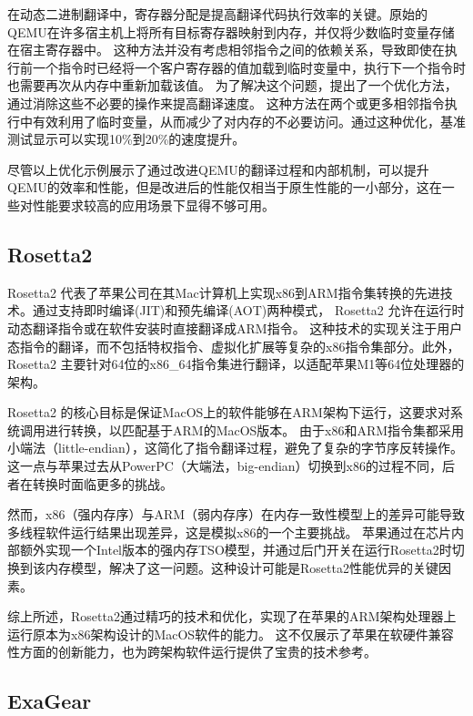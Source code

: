 在动态二进制翻译中，寄存器分配是提高翻译代码执行效率的关键。原始的QEMU在许多宿主机上将所有目标寄存器映射到内存，并仅将少数临时变量存储在宿主寄存器中。
这种方法并没有考虑相邻指令之间的依赖关系，导致即使在执行前一个指令时已经将一个客户寄存器的值加载到临时变量中，执行下一个指令时也需要再次从内存中重新加载该值。
为了解决这个问题，\cite{Hong2012HQEMUAM}提出了一个优化方法，通过消除这些不必要的操作来提高翻译速度。
这种方法在两个或更多相邻指令执行中有效利用了临时变量，从而减少了对内存的不必要访问。通过这种优化，基准测试显示可以实现10\%到20\%的速度提升。

尽管以上优化示例展示了通过改进QEMU的翻译过程和内部机制，可以提升QEMU的效率和性能，但是改进后的性能仅相当于原生性能的一小部分，这在一些对性能要求较高的应用场景下显得不够可用。



\subsection{Rosetta2}

Rosetta2 代表了苹果公司在其Mac计算机上实现x86到ARM指令集转换的先进技术。通过支持即时编译(JIT)和预先编译(AOT)两种模式，
Rosetta2 允许在运行时动态翻译指令或在软件安装时直接翻译成ARM指令。
这种技术的实现关注于用户态指令的翻译，而不包括特权指令、虚拟化扩展等复杂的x86指令集部分。此外，Rosetta2 主要针对64位的x86\_64指令集进行翻译，以适配苹果M1等64位处理器的架构。

Rosetta2 的核心目标是保证MacOS上的软件能够在ARM架构下运行，这要求对系统调用进行转换，以匹配基于ARM的MacOS版本。
由于x86和ARM指令集都采用小端法（little-endian），这简化了指令翻译过程，避免了复杂的字节序反转操作。
这一点与苹果过去从PowerPC（大端法，big-endian）切换到x86的过程不同，后者在转换时面临更多的挑战。

然而，x86（强内存序）与ARM（弱内存序）在内存一致性模型上的差异可能导致多线程软件运行结果出现差异，这是模拟x86的一个主要挑战\cite{Risotto}。
苹果通过在芯片内部额外实现一个Intel版本的强内存TSO模型，并通过后门开关在运行Rosetta2时切换到该内存模型，解决了这一问题。这种设计可能是Rosetta2性能优异的关键因素。

综上所述，Rosetta2通过精巧的技术和优化，实现了在苹果的ARM架构处理器上运行原本为x86架构设计的MacOS软件的能力。
这不仅展示了苹果在软硬件兼容性方面的创新能力，也为跨架构软件运行提供了宝贵的技术参考。

\subsection{ExaGear}

